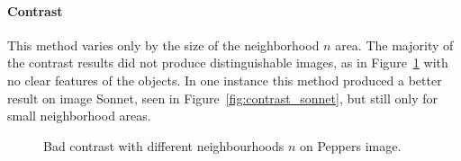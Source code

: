 \documentclass[conference]{IEEEtran}
\begin{document}
\paragraph*{Contrast} This method varies only by the size of the neighborhood $n$ area. The majority of the contrast results did not produce distinguishable images, as in Figure~\ref{fig:contrast_bad_peppers} with no clear features of the objects. In one instance this method produced a better result on image Sonnet, seen in Figure~\ref{fig:contrast_sonnet}, but still only for small neighborhood areas.
\begin{figure}[htbp]
	\centering
	\quad
	\caption{Bad contrast with different neighbourhoods $n$ on Peppers image.}
	\label{fig:contrast_bad_peppers}
\end{figure}
\end{document}
